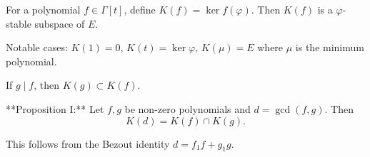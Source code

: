 For a polynomial $f \in \Gamma[t]$, define $K(f) = \ker f(\varphi)$. Then $K(f)$ is a $\varphi$-stable subspace of $E$.

Notable cases: $K(1) = 0$, $K(t) = \ker \varphi$, $K(\mu) = E$ where $\mu$ is the minimum polynomial.

If $g \mid f$, then $K(g) \subset K(f)$.

**Proposition I:** Let $f, g$ be non-zero polynomials and $d = \gcd(f, g)$. Then
$$K(d) = K(f) \cap K(g).$$

This follows from the Bezout identity $d = f_1 f + g_1 g$.
